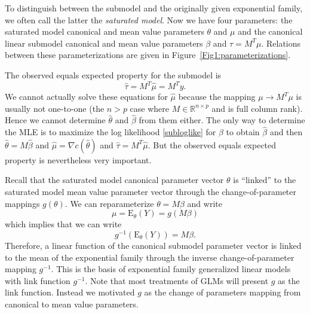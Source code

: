 \documentclass[12pt]{article}
\newcommand{\R}{\mathbb{R}}
\newcommand{\E}{\mathrm{E}}
\DeclareMathOperator{\E}{E}
\begin{document}
To distinguish between the submodel and the originally given exponential family, we often call the latter the \emph{saturated model}. Now we have four parameters: the saturated model canonical and mean value parameters $\theta$ and $\mu$ and the canonical linear submodel canonical and mean value parameters $\beta$ and $\tau = M^T\mu$. Relations between these parameterizations are given in Figure~\ref{Fig1:parameterizations}. 

The observed equals expected property for the submodel is
\begin{equation} \label{submodelmvp}
	\hat\tau = M^T\hat\mu = M^Ty.
\end{equation}
We cannot actually solve these equations for $\hat\mu$ because the mapping $\mu \to M^T\mu$ is usually not one-to-one (the $n > p$ case where $M \in \R^{n \times p}$ and is full column rank). Hence we cannot determine $\hat\theta$ and $\hat\beta$ from them either. The only way to determine the MLE is to maximize the log likelihood \eqref{subloglike} for $\beta$ to obtain $\hat\beta$ and then $\hat\theta = M\hat\beta$ and $\hat\mu = \nabla c(\hat\theta)$ and $\hat\tau = M^T\hat\mu$. But the observed equals expected property is nevertheless very important. %

\vspace{0.5cm}

\vspace{0.5cm}Recall that the saturated model canonical parameter vector $\theta$ is ``linked'' to the saturated model mean value parameter vector through the change-of-parameter mappings $g(\theta)$. We can reparameterize $\theta = M\beta$ and write
$$
 \mu = \E_\theta(Y) = g(M\beta) 
$$
which implies that we can write
$$
  g^{-1}\left(\E_\theta(Y)\right) = M\beta.
$$
Therefore, a linear function of the canonical submodel parameter vector is linked to the mean of the exponential family through the inverse change-of-parameter mapping $g^{-1}$. This is the basis of exponential family generalized linear models with link function $g^{-1}$. Note that most treatments of GLMs will present $g$ as the link function. Instead we motivated $g$ as the change of parameters mapping from canonical to mean value parameters. 


\end{document}
